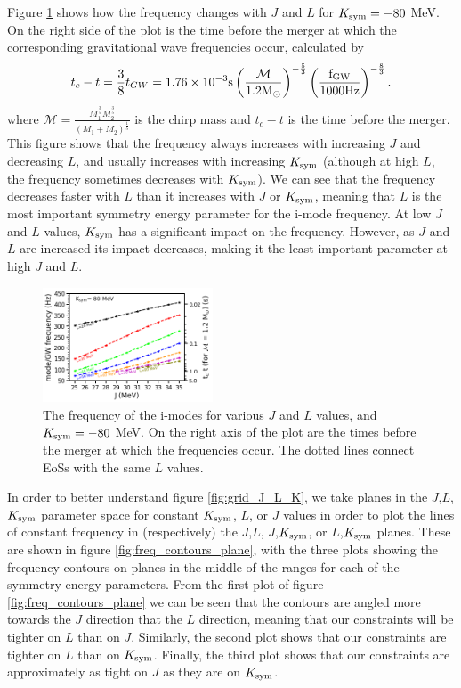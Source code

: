 \documentclass[fleqn,usenatbib]{mnras}
\begin{document}
Figure \ref{fig:J_vs_L_vs_f+tc} shows how the frequency changes with $J$ and $L$ for $K_{\rm sym}=-80$ MeV. On the right side of the plot is the time before the merger at which the corresponding gravitational wave frequencies occur, calculated by \citep{blanchet2006gravitational} %
\begin{align}
t_c-t=\frac{3}{8}t_{GW}=1.76\times 10^{-3}\rm{s}\left(\frac{\mathcal{M}}{1.2M_{\odot}}\right)^{-\frac{5}{3}}\left(\frac{f_{GW}}{1000 \rm{Hz}}\right)^{-\frac{8}{3}}.
\label{eq:t_before_merger}
\end{align}
\noindent where $\mathcal{M}=\frac{M_1^{\frac{3}{5}}M_2^{\frac{3}{5}}}{(M_1+M_2)^{\frac{1}{5}}}$ is the chirp mass and $t_c-t$ is the time before the merger. This figure shows that the frequency always increases with increasing $J$ and decreasing $L$, and usually increases with increasing $K_{\rm sym}$ (although at high $L$, the frequency sometimes decreases with $K_{\rm sym}$). We can see that the frequency decreases faster with $L$ than it increases with $J$ or $K_{\rm sym}$, meaning that $L$ is the most important symmetry energy parameter for the i-mode frequency. At low $J$ and $L$ values, $K_{\rm sym}$ has a significant impact on the frequency. However, as $J$ and $L$ are increased its impact decreases, making it the least important parameter at high $J$ and $L$.


\begin{figure}
\centering
\includegraphics[width=0.45\textwidth,angle=0]{J_L_f_tc_K-80.png}
\caption{The frequency of the i-modes for various $J$ and $L$ values, and $K_{\rm sym}=-80$ MeV. On the right axis of the plot are the times before the merger at which the frequencies occur. The dotted lines connect EoSs with the same $L$ values.}
\label{fig:J_vs_L_vs_f+tc}
\end{figure}


\hspace{\parindent}In order to better understand figure \ref{fig:grid_J_L_K}, we take planes in the $J$,$L$,$K_{\rm sym}$ parameter space for constant $K_{\rm sym}$, $L$, or $J$ values in order to plot the lines of constant frequency in (respectively) the $J$,$L$, $J$,$K_{\rm sym}$, or $L$,$K_{\rm sym}$ planes. These are shown in figure \ref{fig:freq_contours_plane}, with the three plots showing the frequency contours on planes in the middle of the ranges for each of the symmetry energy parameters. From the first plot of figure \ref{fig:freq_contours_plane} we can be seen that the contours are angled more towards the $J$ direction that the $L$ direction, meaning that our constraints will be tighter on $L$ than on $J$. Similarly, the second plot shows that our constraints are tighter on $L$ than on $K_{\rm sym}$. Finally, the third plot shows that our constraints are approximately as tight on $J$ as they are on $K_{\rm sym}$.
\end{document}
